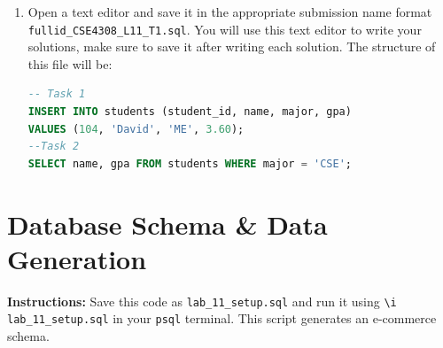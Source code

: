\documentclass[12pt,a4paper]{article}
\begin{document}
\begin{enumerate}
After loading the SQL file, reconnect to PostgreSQL to verify that the tables have been created.

1. Reconnect to Your Database:

   \begin{lstlisting}[language=SQL]
   psql -h localhost -U student_12345 -d cse4308_12345
   \end{lstlisting}

2. Check Tables:

   Verify the tables have been created by listing them:

   \begin{lstlisting}[language=SQL]
   \dt
   \end{lstlisting}

3. View Table Data:

   Verify the data by running the following SQL queries:

   \begin{lstlisting}[language=SQL]
   SELECT * FROM <table_name>;
   \end{lstlisting}

\item Open a text editor and save it in the appropriate submission name format \\ \texttt{fullid\_CSE4308\_L11\_T1.sql}. You will use this text editor to write your solutions, make sure to save it after writing each solution. The structure of this file will be:
\begin{lstlisting}[language=SQL]
-- Task 1
INSERT INTO students (student_id, name, major, gpa)
VALUES (104, 'David', 'ME', 3.60);
--Task 2
SELECT name, gpa FROM students WHERE major = 'CSE';
\end{lstlisting}
\end{enumerate}
\newpage
\section{Database Schema \& Data Generation}
\textbf{Instructions:} Save this code as \texttt{lab\_11\_setup.sql} and run it using \texttt{\textbackslash i lab\_11\_setup.sql} in your \texttt{psql} terminal. This script generates an e-commerce schema.
\end{document}
